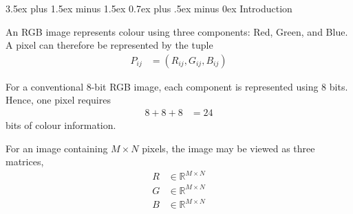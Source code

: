 
\makeatletter

\renewcommand{\thesection}{\Alph{section}}
\renewcommand{\thesubsection}{\thesection.\arabic{subsection}}
\renewcommand{\thesubsubsection}{\thesubsection.\arabic{subsubsection}}

\def\thesubsectiondis{\thesubsection}
\def\thesubsubsectiondis{\thesubsubsection}

\renewcommand\subsection{\@startsection{subsection}{2}{\z@}%
  {3.5ex plus 1.5ex minus 1.5ex}%
  {0.7ex plus .5ex minus 0ex}%
  {\normalfont\normalsize\bfseries\upshape\color{red}}}

\renewcommand\subsubsection{\@startsection{subsubsection}{3}{\z@}%
  {2.5ex plus 1ex minus 1ex}%
  {0.7ex plus .3ex minus 0ex}%
  {\normalfont\normalsize\bfseries\upshape}}

\renewcommand{\theequation}{%
  \thesection.\arabic{subsection}.%
  \ifnum\value{subsubsection}>0
    \arabic{subsubsection}.\fi\arabic{equation}}

\makeatother

\subsection{Introduction}

An RGB image represents colour using three components: Red, Green, and
Blue. A pixel can therefore be represented by the tuple
\begin{align}
P_{ij} &= (R_{ij},G_{ij},B_{ij})\label{eq:app_rgb_pixel}
\end{align}

For a conventional 8-bit RGB image, each component is represented using
8 bits. Hence, one pixel requires
\begin{align}
8+8+8 &= 24\label{eq:app_rgb_bits}
\end{align}
bits of colour information.

For an image containing $M\times N$ pixels, the image may be viewed as
three matrices,
\begin{align}
R&\in\mathbb{R}^{M\times N}\label{eq:app_r_matrix}\\
G&\in\mathbb{R}^{M\times N}\label{eq:app_g_matrix}\\
B&\in\mathbb{R}^{M\times N}\label{eq:app_b_matrix}
\end{align}

